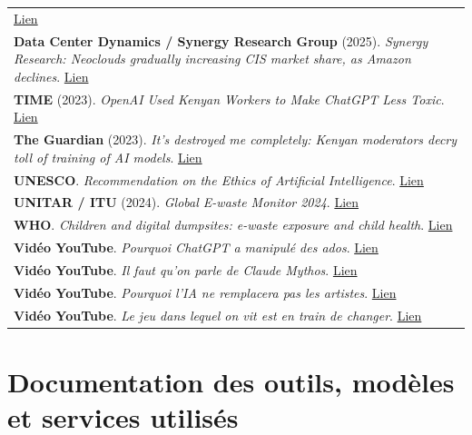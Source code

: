 \documentclass[
  10pt,
  a4paper,
  DIV=11,
  numbers=noendperiod,
  oneside]{scrreprt}
\let\oldtextbf\textbf
\renewcommand{\textbf}[1]{\oldtextbf{\textcolor{cmmnavy}{#1}}}
\let\oldemph\emph
\renewcommand{\emph}[1]{\oldemph{\textcolor{cmmgray}{#1}}}
\begin{document}
{\begin{longtable}[]{@{}
  >{\raggedright\arraybackslash}p{}@{}}
\href{https://theshiftproject.org/article/pour-une-sobriete-numerique-rapport-shift/}{Lien} \\
\textbf{Data Center Dynamics / Synergy Research Group} (2025).
\emph{Synergy Research: Neoclouds gradually increasing CIS market share,
as Amazon declines}.
\href{https://www.datacenterdynamics.com/en/news/synergy-research-neoclouds-gradually-increasing-cis-market-share-as-amazon-declines/}{Lien} \\
\textbf{TIME} (2023). \emph{OpenAI Used Kenyan Workers to Make ChatGPT
Less Toxic}.
\href{https://time.com/6247678/openai-chatgpt-kenya-workers/}{Lien} \\
\textbf{The Guardian} (2023). \emph{It's destroyed me completely: Kenyan
moderators decry toll of training of AI models}.
\href{https://www.theguardian.com/technology/2023/aug/02/ai-chatbot-training-human-toll-content-moderator-meta-openai}{Lien} \\
\textbf{UNESCO}. \emph{Recommendation on the Ethics of Artificial
Intelligence}.
\href{https://www.unesco.org/en/articles/recommendation-ethics-artificial-intelligence?hub=343}{Lien} \\
\textbf{UNITAR / ITU} (2024). \emph{Global E-waste Monitor 2024}.
\href{https://ewastemonitor.info/the-global-e-waste-monitor-2024/}{Lien} \\
\textbf{WHO}. \emph{Children and digital dumpsites: e-waste exposure and
child health}.
\href{https://www.who.int/publications/i/item/9789240023901}{Lien} \\
\textbf{Vidéo YouTube}. \emph{Pourquoi ChatGPT a manipulé des ados}.
\href{https://www.youtube.com/watch?v=fbAfLv7CBic}{Lien} \\
\textbf{Vidéo YouTube}. \emph{Il faut qu'on parle de Claude Mythos}.
\href{https://www.youtube.com/watch?v=JBaBAg4ny6U}{Lien} \\
\textbf{Vidéo YouTube}. \emph{Pourquoi l'IA ne remplacera pas les
artistes}. \href{https://www.youtube.com/watch?v=B_MR20jqR48}{Lien} \\
\textbf{Vidéo YouTube}. \emph{Le jeu dans lequel on vit est en train de
changer}. \href{https://www.youtube.com/watch?v=waoKjITpot0}{Lien} \\
\end{longtable}
}

\section{Documentation des outils, modèles et services
utilisés}\label{documentation-des-outils-moduxe8les-et-services-utilisuxe9s}
\end{document}
